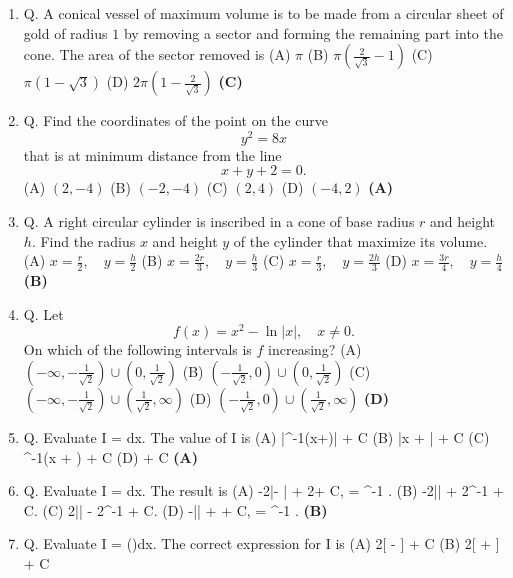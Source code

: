 \documentclass{article}
\begin{document}
\begin{enumerate}
(B) $\frac{2}{e}$
(C) $\frac{\sqrt{2}}{\sqrt{e}}$
(D) $\frac{1}{\sqrt{2}e}$ \hfill \textbf{(C)}
\item Q. A conical vessel of maximum volume is to be made from a circular sheet of gold of radius $1$ by removing a sector and forming the remaining part into the cone. The area of the sector removed is
(A) $\pi$
(B) $\pi\left(\frac{2}{\sqrt{3}}-1\right)$
(C) $\pi\left(1 - \sqrt{3}\right)$
(D) $2\pi \left(1 - \frac{2}{\sqrt{3}}\right)$ \hfill \textbf{(C)}
\item Q. Find the coordinates of the point on the curve
$$y^2 = 8x$$that is at minimum distance from the line
$$x + y + 2 = 0.$$
(A) $(2, -4)$
(B) $(-2, -4)$
(C) $(2, 4)$
(D) $(-4, 2)$ \hfill \textbf{(A)}
\item Q. A right circular cylinder is inscribed in a cone of base radius $r$ and height $h$. Find the radius $x$ and height $y$ of the cylinder that maximize its volume.
(A) $x = \frac{r}{2}, \quad y = \frac{h}{2}$
(B) $x = \frac{2r}{3}, \quad y = \frac{h}{3}$
(C) $x = \frac{r}{3}, \quad y = \frac{2h}{3}$
(D) $x = \frac{3r}{4}, \quad y = \frac{h}{4}$ \hfill \textbf{(B)}
\item Q. Let
$$f(x) = x^2 - \ln |x|, \quad x \neq 0.$$On which of the following intervals is $f$ increasing?
(A) $\left(-\infty, -\frac{1}{\sqrt{2}}\right) \cup \left(0, \frac{1}{\sqrt{2}}\right)$
(B) $\left(-\frac{1}{\sqrt{2}}, 0\right) \cup \left(0, \frac{1}{\sqrt{2}}\right)$
(C) $\left(-\infty, -\frac{1}{\sqrt{2}}\right) \cup \left(\frac{1}{\sqrt{2}}, \infty\right)$
(D) $\left(-\frac{1}{\sqrt{2}}, 0\right) \cup \left(\frac{1}{\sqrt{2}}, \infty\right)$ \hfill \textbf{(D)}
\item Q. Evaluate I = \int {} dx.
The value of I is
(A) \ln|\tan^{-1}(x+)| + C
(B) \ln|x + | + C
(C) \tan^{-1}(x + ) + C
(D)  + C \hfill \textbf{(A)}
\item Q. Evaluate I = \int {} dx.
The result is
(A) -2\ln|\sec\theta - \tan\theta| + 2\theta + C, \theta = \cos^{-1} .
(B) -2\ln|| + 2\cos^{-1}  + C.
(C) 2\ln|| - 2\sin^{-1}  + C.
(D) -\ln|| + \theta + C, \theta = \sin^{-1} . \hfill \textbf{(B)}
\item Q. Evaluate I = \int \cos()dx.
The correct expression for I is
(A) 2[ \sin{} - \cos{}] + C
(B) 2[ \sin{} + \cos{}] + C

\end{enumerate}
\end{document}
